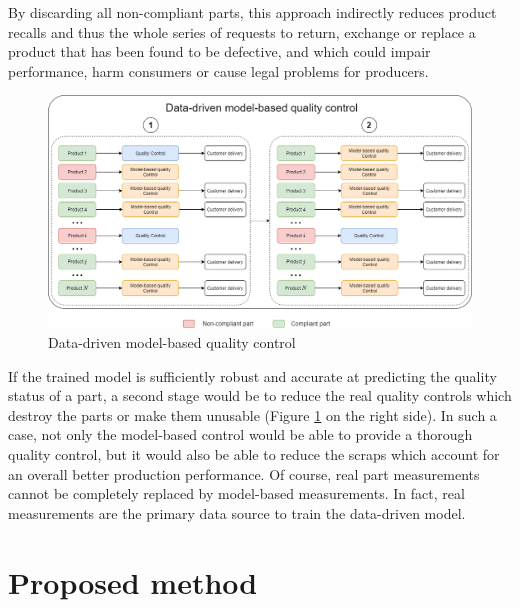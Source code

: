 By discarding all non-compliant parts, this approach indirectly reduces product recalls and thus the whole series of requests to return, exchange or replace a product that has been found to be defective, and which could impair performance, harm consumers or cause legal problems for producers.

\begin{landscape}
\begin{figure}
\centering
\includegraphics[scale=0.50]{images/chapter_4/data_driven_model.png}
\caption{Data-driven model-based quality control}
\label{fig:model_quality_control}
\end{figure}
\end{landscape}

If the trained model is sufficiently robust and accurate at predicting the quality status of a part, a second stage would be to reduce the real quality controls which destroy the parts or make them unusable (Figure \ref{fig:model_quality_control} on the right side). In such a case, not only the model-based control would be able to provide a thorough quality control, but it would also be able to reduce the scraps which account for an overall better production performance. Of course, real part measurements cannot be completely replaced by model-based measurements. In fact, real measurements are the primary data source to train the data-driven model. 


\section{Proposed method} \label{Proposed Method}

